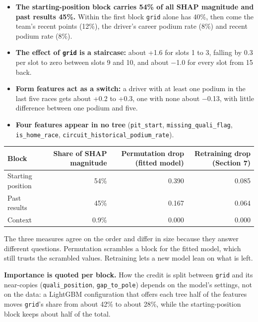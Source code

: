 \documentclass[11pt,a4paper]{article}
\begin{document}
\begin{itemize}
\item \textbf{The starting-position block carries 54\% of all SHAP magnitude and past results 45\%.} Within the first block \texttt{grid} alone has 40\%, then come the team's recent points (12\%), the driver's career podium rate (8\%) and recent podium rate (8\%).
\item \textbf{The effect of \texttt{grid} is a staircase:} about +1.6 for slots 1 to 3, falling by 0.3 per slot to zero between slots 9 and 10, and about −1.0 for every slot from 15 back.
\item \textbf{Form features act as a switch:} a driver with at least one podium in the last five races gets about +0.2 to +0.3, one with none about −0.13, with little difference between one podium and five.
\item \textbf{Four features appear in no tree} (\texttt{pit\_\allowbreak{}start}, \texttt{missing\_\allowbreak{}quali\_\allowbreak{}flag}, \texttt{is\_\allowbreak{}home\_\allowbreak{}race}, \texttt{circuit\_\allowbreak{}historical\_\allowbreak{}podium\_\allowbreak{}rate}).
\end{itemize}

{\small
\begin{xltabular}{\linewidth}{>{\raggedright\arraybackslash}Xrrr}
\toprule
\textbf{Block} & \textbf{Share of SHAP magnitude} & \textbf{Permutation drop (fitted model)} & \textbf{Retraining drop (Section 7)} \\
\midrule
\endhead
Starting position & 54\% & 0.390 & 0.085 \\
Past results & 45\% & 0.167 & 0.064 \\
Context & 0.9\% & 0.000 & 0.000 \\
\bottomrule
\end{xltabular}
}

The three measures agree on the order and differ in size because they answer different questions. Permutation scrambles a block for the fitted model, which still trusts the scrambled values. Retraining lets a new model lean on what is left.

\textbf{Importance is quoted per block.} How the credit is split between \texttt{grid} and its near-copies (\texttt{quali\_\allowbreak{}position}, \texttt{gap\_\allowbreak{}to\_\allowbreak{}pole}) depends on the model's settings, not on the data: a LightGBM configuration that offers each tree half of the features moves \texttt{grid}'s share from about 42\% to about 28\%, while the starting-position block keeps about half of the total.
\end{document}
